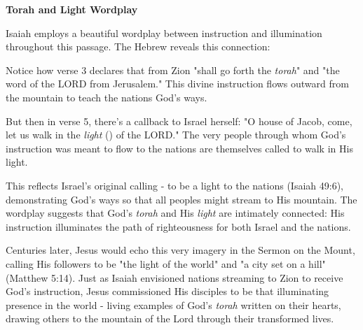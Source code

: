 \documentclass[11pt]{article}
\begin{document}
\newpage{}

{\large\bfseries Torah and Light Wordplay}
\vspace{1em}

Isaiah employs a beautiful wordplay between instruction and illumination throughout this passage. The Hebrew reveals this connection:

\vspace{1em}


\vspace{1em}
Notice how verse 3 declares that from Zion "shall go forth the \textit{torah}" and "the word of the LORD from Jerusalem." This divine instruction flows outward from the mountain to teach the nations God's ways. 

\vspace{1em}
But then in verse 5, there's a callback to Israel herself: "O house of Jacob, come, let us walk in the \textit{light} () of the LORD." The very people through whom God's instruction was meant to flow to the nations are themselves called to walk in His light.

\vspace{1em}
This reflects Israel's original calling - to be a light to the nations (Isaiah 49:6), demonstrating God's ways so that all peoples might stream to His mountain. The wordplay suggests that God's \textit{torah} and His \textit{light} are intimately connected: His instruction illuminates the path of righteousness for both Israel and the nations.

\vspace{1em}
Centuries later, Jesus would echo this very imagery in the Sermon on the Mount, calling His followers to be "the light of the world" and "a city set on a hill" (Matthew 5:14). Just as Isaiah envisioned nations streaming to Zion to receive God's instruction, Jesus commissioned His disciples to be that illuminating presence in the world - living examples of God's \textit{torah} written on their hearts, drawing others to the mountain of the Lord through their transformed lives.

\begin{thesauce}

\end{thesauce}
\end{document}

